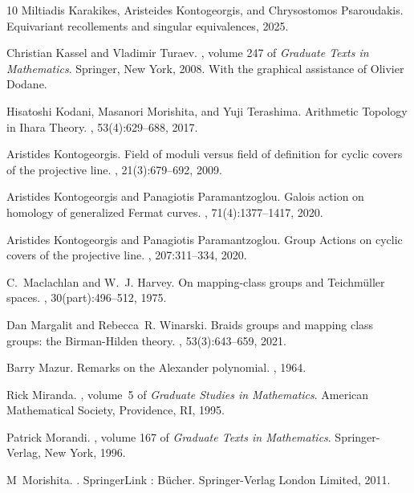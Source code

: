 \documentclass[10pt]{amsart}
\theoremstyle{definition}
\begin{document}
\begin{thebibliography}{10}
Miltiadis Karakikes, Aristeides Kontogeorgis, and Chrysostomos Psaroudakis.
\newblock Equivariant recollements and singular equivalences, 2025.

Christian Kassel and Vladimir Turaev.
, volume 247 of {\em Graduate Texts in
  Mathematics}.
\newblock Springer, New York, 2008.
\newblock With the graphical assistance of Olivier Dodane.

Hisatoshi Kodani, Masanori Morishita, and Yuji Terashima.
\newblock Arithmetic {T}opology in {I}hara {T}heory.
, 53(4):629--688, 2017.

Aristides Kontogeorgis.
\newblock Field of moduli versus field of definition for cyclic covers of the
  projective line.
, 21(3):679--692, 2009.

Aristides Kontogeorgis and Panagiotis Paramantzoglou.
\newblock Galois action on homology of generalized {F}ermat curves.
, 71(4):1377--1417, 2020.

Aristides Kontogeorgis and Panagiotis Paramantzoglou.
\newblock Group {A}ctions on cyclic covers of the projective line.
, 207:311--334, 2020.

C.~Maclachlan and W.~J. Harvey.
\newblock On mapping-class groups and {T}eichm\"uller spaces.
, 30(part):496--512, 1975.

Dan Margalit and Rebecca~R. Winarski.
\newblock Braids groups and mapping class groups: the {B}irman-{H}ilden theory.
, 53(3):643--659, 2021.

Barry Mazur.
\newblock Remarks on the {A}lexander polynomial.
, 1964.

Rick Miranda.
, volume~5 of {\em
  Graduate Studies in Mathematics}.
\newblock American Mathematical Society, Providence, RI, 1995.

Patrick Morandi.
, volume 167 of {\em Graduate Texts in
  Mathematics}.
\newblock Springer-Verlag, New York, 1996.

M~Morishita.
.
\newblock SpringerLink : B{\"{u}}cher. Springer-Verlag London Limited, 2011.


\end{thebibliography}
\end{document}
